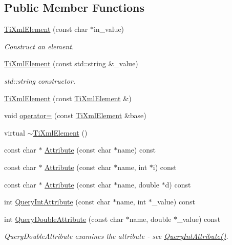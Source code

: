 \subsection*{Public Member Functions}
\begin{DoxyCompactItemize}
\item 
\hyperlink{class_ti_xml_element_a01bc3ab372d35da08efcbbe65ad90c60}{Ti\-Xml\-Element} (const char $\ast$in\-\_\-value)
\begin{DoxyCompactList}\small\item\em Construct an element. \end{DoxyCompactList}\item 
\hyperlink{class_ti_xml_element_a40fc2e3c1a955e2f78e1a32350d180e7}{Ti\-Xml\-Element} (const std\-::string \&\-\_\-value)
\begin{DoxyCompactList}\small\item\em std\-::string constructor. \end{DoxyCompactList}\item 
\hyperlink{class_ti_xml_element_a1ca4465f3c2eac6a60e641cd7f1d9f7e}{Ti\-Xml\-Element} (const \hyperlink{class_ti_xml_element}{Ti\-Xml\-Element} \&)
\item 
void \hyperlink{class_ti_xml_element_af5cd4156e082ef3bf23adfe0ed173340}{operator=} (const \hyperlink{class_ti_xml_element}{Ti\-Xml\-Element} \&base)
\item 
virtual \hyperlink{class_ti_xml_element_aa049a47c5081c0d021968666360da261}{$\sim$\-Ti\-Xml\-Element} ()
\item 
const char $\ast$ \hyperlink{class_ti_xml_element_ac1e4691e9375ba4e665dce7e46a50a9c}{Attribute} (const char $\ast$name) const 
\item 
const char $\ast$ \hyperlink{class_ti_xml_element_aa9192e80567b5042dbded80b78c44339}{Attribute} (const char $\ast$name, int $\ast$i) const 
\item 
const char $\ast$ \hyperlink{class_ti_xml_element_aec4f727f8aa49b51248d80125d173136}{Attribute} (const char $\ast$name, double $\ast$d) const 
\item 
int \hyperlink{class_ti_xml_element_aea0bfe471380f281c5945770ddbf52b9}{Query\-Int\-Attribute} (const char $\ast$name, int $\ast$\-\_\-value) const 
\item 
int \hyperlink{class_ti_xml_element_a898d7730ecc341f0bffc7a9dadbf1ce7}{Query\-Double\-Attribute} (const char $\ast$name, double $\ast$\-\_\-value) const 
\begin{DoxyCompactList}\small\item\em Query\-Double\-Attribute examines the attribute -\/ see \hyperlink{class_ti_xml_element_aea0bfe471380f281c5945770ddbf52b9}{Query\-Int\-Attribute()}. \end{DoxyCompactList}\item 

\end{DoxyCompactItemize}
